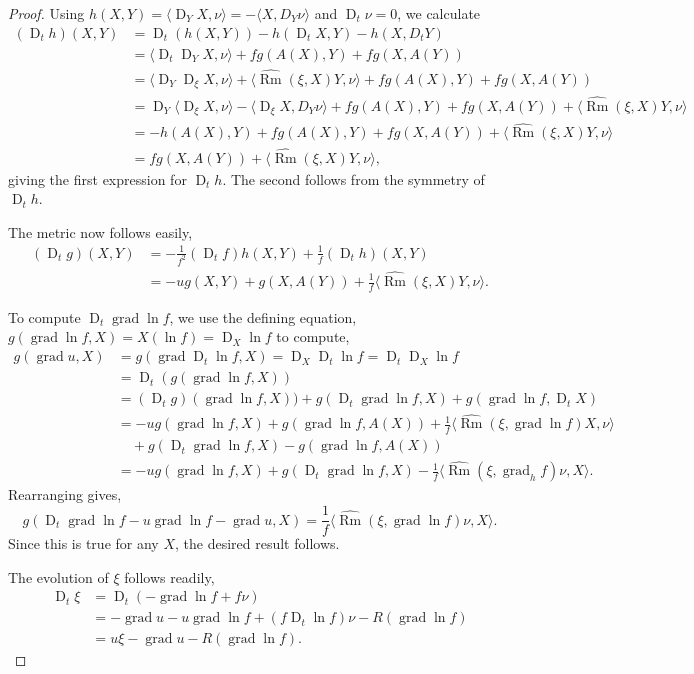 \documentclass{amsart}
\theoremstyle{definition}
\theoremstyle{remark}
\newcommand{\ip}[2]{\ensuremath{\langle{#1},{#2}\rangle}}
\DeclareMathOperator{\grad}{grad}
\DeclareMathOperator{\Rm}{Rm}
\DeclareMathOperator{\D}{D}
\numberwithin{equation}{section}
\begin{document}
\begin{proof}
Using $h(X,Y) = \ip{\D_Y X}{\nu} = -\ip{X}{D_Y \nu}$ and $\D_t\nu = 0$, we calculate
\[
\begin{split}
(\D_t h) (X, Y) &= \D_t (h(X, Y)) - h(\D_t X, Y) - h(X, D_t Y) \\
&= \ip{\D_t \D_Y X}{\nu} + f g(A(X), Y) + f g(X, A(Y)) \\
&= \ip{\D_Y \D_{\xi} X}{\nu} + \ip{\widehat{\Rm}(\xi, X) Y}{\nu} + f g(A(X), Y) + f g(X, A(Y))\\
&= \D_Y \ip{\D_{\xi} X}{\nu} - \ip{\D_{\xi} X}{D_Y \nu} + f g(A(X), Y) + f g(X, A(Y)) + \ip{\widehat{\Rm}(\xi, X) Y}{\nu} \\
&= - h(A(X), Y) + f g(A(X), Y) + f g(X, A(Y)) + \ip{\widehat{\Rm}(\xi, X) Y}{\nu} \\
&= fg(X, A(Y)) + \ip{\widehat{\Rm}(\xi, X) Y}{\nu},
\end{split}
\]
giving the first expression for $\D_t h$. The second follows from the symmetry of $\D_t h$.

The metric now follows easily,
\[
\begin{split}
(\D_t g) (X, Y) &= -\frac{1}{f^2} (\D_t f) h(X, Y) + \frac{1}{f} (\D_t h) (X, Y) \\
&= -u g(X, Y) + g(X, A(Y)) + \frac{1}{f} \ip{\widehat{\Rm}(\xi, X) Y}{\nu}.
\end{split}
\]

To compute $\D_t \grad \ln f$, we use the defining equation, $g(\grad \ln f, X) = X(\ln f) = \D_X \ln f$ to compute,
\[
\begin{split}
g(\grad u, X) &= g(\grad \D_t \ln f, X) = \D_X \D_t \ln f = \D_t \D_X \ln f \\
&=  \D_t (g(\grad \ln f, X)) \\
&= (\D_t g) (\grad \ln f, X)) + g(\D_t \grad \ln f, X) + g(\grad \ln f, \D_t X) \\
&= -ug(\grad\ln f, X) + g(\grad \ln f, A(X)) + \frac{1}{f}\ip{\widehat{\Rm}(\xi, \grad \ln f)X}{\nu} \\
&\quad  + g(\D_t \grad \ln f, X) - g(\grad \ln f, A(X)) \\
&= - u g(\grad \ln f, X) + g(\D_t \grad \ln f, X) - \frac{1}{f} \ip{\widehat{\Rm}(\xi, \grad_h f)\nu}{X}.
\end{split}
\]
Rearranging gives,
\[
g(\D_t \grad \ln f - u \grad\ln f - \grad u, X) = \frac{1}{f} \ip{\widehat{\Rm}(\xi, \grad \ln f) \nu}{X}.
\]
Since this is true for any $X$, the desired result follows.

The evolution of $\xi$ follows readily,
\[
\begin{split}
\D_t \xi &= \D_t (-\grad \ln f + f \nu) \\
& = -\grad u - u \grad \ln f + (f \D_t \ln f) \nu - R(\grad \ln f) \\
&= u\xi - \grad u - R(\grad \ln f).
\end{split}
\]


\end{proof}
\end{document}
